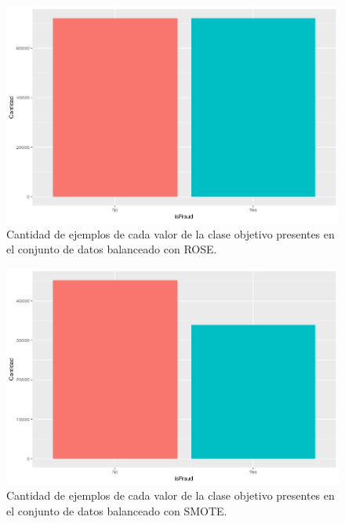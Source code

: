 \begin{figure}
    \includegraphics[width=\textwidth]{images/preprocessing/class-rose-barplot.png}
    \caption{Cantidad de ejemplos de cada valor de la clase objetivo presentes en el conjunto de datos balanceado con ROSE.}
    \label{fig:class-rose-barplot}
\end{figure}

\begin{figure}
    \includegraphics[width=\textwidth]{images/preprocessing/class-smote-barplot.png}
    \caption{Cantidad de ejemplos de cada valor de la clase objetivo presentes en el conjunto de datos balanceado con SMOTE.}
    \label{fig:class-smote-barplot}
\end{figure}
